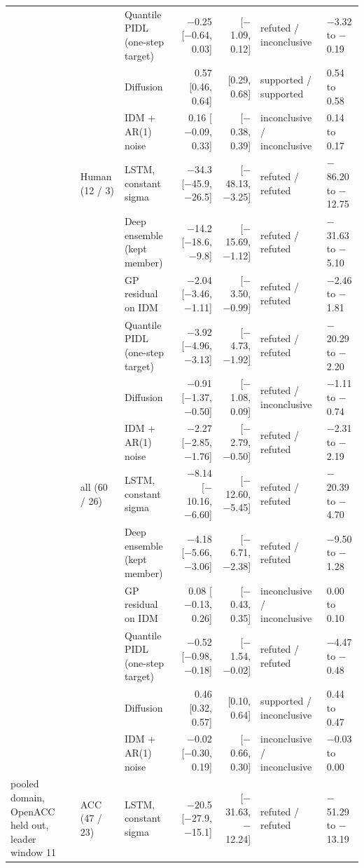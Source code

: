 \begin{longtable}{lllrrll}
 &  & Quantile PIDL (one-step target) & $-$0.25 [$-$0.64, 0.03] & [$-$1.09, 0.12] & refuted / inconclusive & $-$3.32 to $-$0.19 \\
 &  & Diffusion & 0.57 [0.46, 0.64] & [0.29, 0.68] & supported / supported & 0.54 to 0.58 \\
 &  & IDM + AR(1) noise & 0.16 [$-$0.09, 0.33] & [$-$0.38, 0.39] & inconclusive / inconclusive & 0.14 to 0.17 \\
\midrule
 & Human (12 / 3) & LSTM, constant sigma & $-$34.3 [$-$45.9, $-$26.5] & [$-$48.13, $-$3.25] & refuted / refuted & $-$86.20 to $-$12.75 \\
 &  & Deep ensemble (kept member) & $-$14.2 [$-$18.6, $-$9.8] & [$-$15.69, $-$1.12] & refuted / refuted & $-$31.63 to $-$5.10 \\
 &  & GP residual on IDM & $-$2.04 [$-$3.46, $-$1.11] & [$-$3.50, $-$0.99] & refuted / refuted & $-$2.46 to $-$1.81 \\
 &  & Quantile PIDL (one-step target) & $-$3.92 [$-$4.96, $-$3.13] & [$-$4.73, $-$1.92] & refuted / refuted & $-$20.29 to $-$2.20 \\
 &  & Diffusion & $-$0.91 [$-$1.37, $-$0.50] & [$-$1.08, 0.09] & refuted / inconclusive & $-$1.11 to $-$0.74 \\
 &  & IDM + AR(1) noise & $-$2.27 [$-$2.85, $-$1.76] & [$-$2.79, $-$0.50] & refuted / refuted & $-$2.31 to $-$2.19 \\
\midrule
 & all (60 / 26) & LSTM, constant sigma & $-$8.14 [$-$10.16, $-$6.60] & [$-$12.60, $-$5.45] & refuted / refuted & $-$20.39 to $-$4.70 \\
 &  & Deep ensemble (kept member) & $-$4.18 [$-$5.66, $-$3.06] & [$-$6.71, $-$2.38] & refuted / refuted & $-$9.50 to $-$1.28 \\
 &  & GP residual on IDM & 0.08 [$-$0.13, 0.26] & [$-$0.43, 0.35] & inconclusive / inconclusive & 0.00 to 0.10 \\
 &  & Quantile PIDL (one-step target) & $-$0.52 [$-$0.98, $-$0.18] & [$-$1.54, $-$0.02] & refuted / refuted & $-$4.47 to $-$0.48 \\
 &  & Diffusion & 0.46 [0.32, 0.57] & [0.10, 0.64] & supported / inconclusive & 0.44 to 0.47 \\
 &  & IDM + AR(1) noise & $-$0.02 [$-$0.30, 0.19] & [$-$0.66, 0.30] & inconclusive / inconclusive & $-$0.03 to 0.00 \\
\midrule
pooled domain, OpenACC held out, leader window 11 & ACC (47 / 23) & LSTM, constant sigma & $-$20.5 [$-$27.9, $-$15.1] & [$-$31.63, $-$12.24] & refuted / refuted & $-$51.29 to $-$13.19 \\

\end{longtable}
